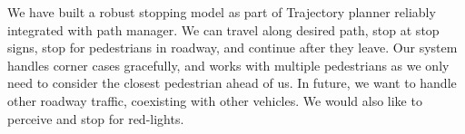 \documentclass[letterpaper, 10 pt, conference]{ieeeconf}  %
\begin{document}
We have built a robust stopping model as part of Trajectory planner reliably integrated with path manager.
We can travel along desired path, stop at stop signs, stop for pedestrians in roadway, and continue after 
they leave. Our system handles corner cases gracefully, and works with multiple pedestrians as we only 
need to consider the closest pedestrian ahead of us. In future, we want to handle other roadway traffic, 
coexisting with other vehicles. We would also like to perceive and stop for red-lights.




\end{document}
